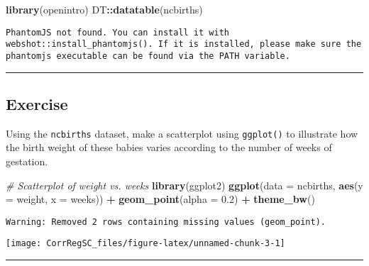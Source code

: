 \documentclass[
]{book}
\newenvironment{Shaded}{\begin{snugshade}}{\end{snugshade}}
\newcommand{\CommentTok}[1]{\textcolor[rgb]{0.56,0.35,0.01}{\textit{#1}}}
\newcommand{\DataTypeTok}[1]{\textcolor[rgb]{0.13,0.29,0.53}{#1}}
\newcommand{\FloatTok}[1]{\textcolor[rgb]{0.00,0.00,0.81}{#1}}
\newcommand{\KeywordTok}[1]{\textcolor[rgb]{0.13,0.29,0.53}{\textbf{#1}}}
\newcommand{\NormalTok}[1]{#1}
\newcommand{\OperatorTok}[1]{\textcolor[rgb]{0.81,0.36,0.00}{\textbf{#1}}}
\newcommand{\StringTok}[1]{\textcolor[rgb]{0.31,0.60,0.02}{#1}}
\begin{document}
\begin{Shaded}
\begin{Highlighting}[]
\KeywordTok{library}\NormalTok{(openintro)}
\NormalTok{DT}\OperatorTok{::}\KeywordTok{datatable}\NormalTok{(ncbirths)}
\end{Highlighting}
\end{Shaded}

\begin{verbatim}
PhantomJS not found. You can install it with webshot::install_phantomjs(). If it is installed, please make sure the phantomjs executable can be found via the PATH variable.
\end{verbatim}

\begin{center}\rule{0.5\linewidth}{0.5pt}\end{center}

\hypertarget{exercise}{%
\subsection*{Exercise}\label{exercise}}

Using the \texttt{ncbirths} dataset, make a scatterplot using \texttt{ggplot()} to illustrate how the birth weight of these babies varies according to the number of weeks of gestation.

\begin{Shaded}
\begin{Highlighting}[]
\CommentTok{# Scatterplot of weight vs. weeks}
\KeywordTok{library}\NormalTok{(ggplot2)}
\KeywordTok{ggplot}\NormalTok{(}\DataTypeTok{data =}\NormalTok{ ncbirths, }\KeywordTok{aes}\NormalTok{(}\DataTypeTok{y =}\NormalTok{ weight, }\DataTypeTok{x =}\NormalTok{ weeks)) }\OperatorTok{+}
\StringTok{  }\KeywordTok{geom_point}\NormalTok{(}\DataTypeTok{alpha =} \FloatTok{0.2}\NormalTok{) }\OperatorTok{+}\StringTok{ }
\StringTok{  }\KeywordTok{theme_bw}\NormalTok{()}
\end{Highlighting}
\end{Shaded}

\begin{verbatim}
Warning: Removed 2 rows containing missing values (geom_point).
\end{verbatim}

\begin{center}\texttt{[image: CorrRegSC\_files/figure-latex/unnamed-chunk-3-1]} \end{center}

\begin{center}\rule{0.5\linewidth}{0.5pt}\end{center}
\end{document}
